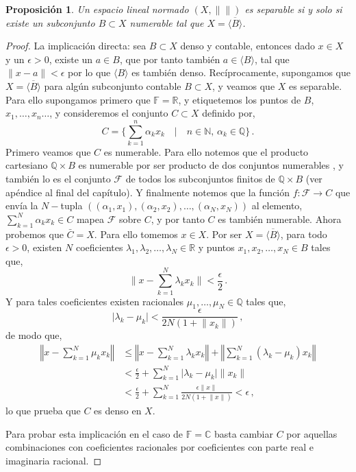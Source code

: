 \documentclass[12pt]{book}
\newtheorem{prop}{\bf Proposición}[chapter]
\def\NN{\mathbb{N}}
\def\QQ{\mathbb{Q}}
\def\RR{\mathbb{R}}
\def\CC{\mathbb{C}}
\def\FF{\mathbb{F}}
\newcommand{\abs}[1]{\lvert #1\rvert }
\newcommand{\norm}[1]{\lVert #1\rVert }
\begin{document}
\begin{prop}
Un espacio lineal normado $(X,\norm{})$ es separable si y solo si existe un subconjunto $B\subset 
X$ numerable tal que $X =\overline{\langle B\rangle}$.
\end{prop}
\begin{proof}
La implicación directa: sea $B\subset X$ denso y contable, entonces dado $x\in X$ y un $\epsilon 
>0$,  existe un $a\in B$, que por tanto también $a\in \langle B\rangle$, tal que $\norm{x - a}
<\epsilon$ por lo que $\langle B\rangle$ es también denso.
Recíprocamente, supongamos que $X=\overline{\langle B\rangle}$ para algún subconjunto 
contable $B\subset X$,  y veamos que $X$ es separable. Para ello supongamos primero que $
\FF=\RR$, y  etiquetemos   los puntos de $B$, $x_1,\dots,x_n\dots$, y consideremos el conjunto 
$C\subset X$ definido por,
$$C=\{ \sum_{k=1}^n \alpha_k x_k\quad|\quad   n\in\NN,\, \alpha_k\in \QQ\}\,.$$
Primero veamos que $C$ es numerable. Para ello notemos que el producto cartesiano $\QQ\times 
B$ es numerable  por ser producto de dos conjuntos numerables , y también lo es el conjunto $
\mathcal{F}$ de todos los subconjuntos finitos de $\QQ\times B$ (ver apéndice al final del capítulo). 
Y finalmente notemos que la función $f:\mathcal{F}\longrightarrow C$ que envía la $N-$tupla $
((\alpha_1,x_1),(\alpha_2,x_2),\dots,(\alpha_N,x_N))$ al elemento, $\sum_{k=1}^N \alpha_kx_k\in 
C$ mapea $\mathcal{F}$ sobre $C$, y por tanto $C$ es también numerable.
Ahora probemos que $\bar C=X$. Para ello tomemos $x\in X$. Por ser $X=\overline{\langle  
B\rangle}$, para todo $\epsilon>0$, existen $N$ coeficientes $\lambda_1,\lambda_2,\dots,
\lambda_N\in \RR$ y puntos $x_1,x_2,\dots, x_N\in B$ tales que,
$$\norm{x-\sum_{k=1}^N \lambda_k x_k}<\frac{\epsilon}{2}\,.$$
Y para tales coeficientes existen racionales $\mu_1,\dots,\mu_N\in \QQ$ tales que,
$$\abs{\lambda_k -\mu_k}<\frac{\epsilon}{2N(1+\norm{x_k})}\,,$$
de modo que,
\begin{align*}
\left\Vert x-\sum_{k=1}^N\mu_k x_k\right\Vert&\leq\left\Vert x-\sum_{k=1}^N \lambda_k x_k\right\Vert 
+\left\Vert \sum_{k=1}^N(\lambda_k-\mu_k) x_k\right\Vert \\
&<\frac{\epsilon}{2}+\sum_{k=1}^N \abs{\lambda_k-\mu_k}\norm{x_k}\\
&<\frac{\epsilon}{2} +\sum_{k=1}^N \frac{\epsilon \norm{x}}{2N(1+\norm{x})}<\epsilon\,,
\end{align*}
 lo que prueba que $C$ es denso en $X$.
 
 Para probar esta implicación en el caso de $\FF=\CC$ basta cambiar $C$ por aquellas 
combinaciones con coeficientes racionales por coeficientes con parte real e imaginaria racional.
 


\end{proof}
\end{document}
